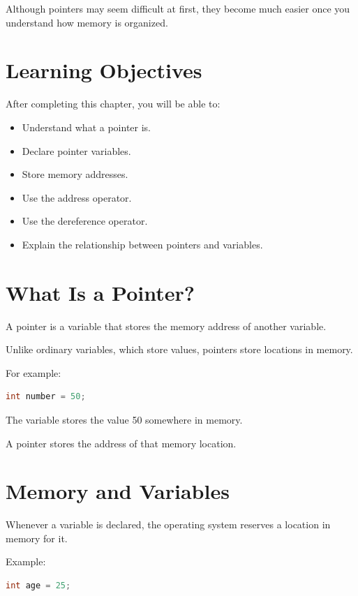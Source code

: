 \documentclass[12pt,openany]{book}
\begin{document}
Although pointers may seem difficult at first, they become much easier once you understand how memory is organized.

\section{Learning Objectives}

After completing this chapter, you will be able to:

\begin{itemize}
    \item Understand what a pointer is.
    \item Declare pointer variables.
    \item Store memory addresses.
    \item Use the address operator.
    \item Use the dereference operator.
    \item Explain the relationship between pointers and variables.
\end{itemize}

\section{What Is a Pointer?}

A pointer is a variable that stores the memory address of another variable.

Unlike ordinary variables, which store values, pointers store locations in memory.

For example:

\begin{lstlisting}[language=C]
int number = 50;
\end{lstlisting}

The variable stores the value 50 somewhere in memory.

A pointer stores the address of that memory location.

\section{Memory and Variables}

Whenever a variable is declared, the operating system reserves a location in memory for it.

Example:

\begin{lstlisting}[language=C]
int age = 25;
\end{lstlisting}
\end{document}
